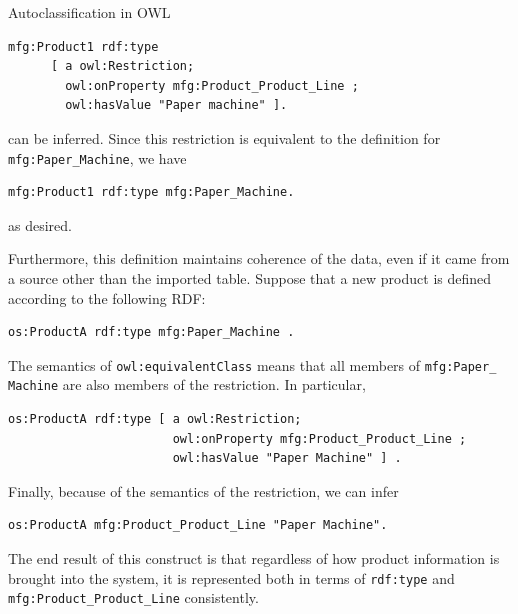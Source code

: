 \begin{challenge}{Autoclassification in OWL}
\begin{lstlisting}
mfg:Product1 rdf:type 
      [ a owl:Restriction; 
        owl:onProperty mfg:Product_Product_Line ;
        owl:hasValue "Paper machine" ].
\end{lstlisting}

can be inferred. Since this restriction is equivalent to the definition
for \texttt{mfg:Paper\_Machine}, we have

\begin{lstlisting}
mfg:Product1 rdf:type mfg:Paper_Machine.
\end{lstlisting}

as desired.

Furthermore, this definition maintains coherence of the data, even if it
came from a source other than the imported table. Suppose that a new
product is defined according to the following RDF:

\begin{lstlisting}
os:ProductA rdf:type mfg:Paper_Machine .
\end{lstlisting}

The semantics of \texttt{owl:equivalentClass} means that all members of
\texttt{mfg:Paper\_ Machine} are also members of the restriction. In particular,

\begin{lstlisting}
os:ProductA rdf:type [ a owl:Restriction;
                       owl:onProperty mfg:Product_Product_Line ;
                       owl:hasValue "Paper Machine" ] .
\end{lstlisting}

Finally, because of the semantics of the restriction, we can infer

\begin{lstlisting}
os:ProductA mfg:Product_Product_Line "Paper Machine".
\end{lstlisting}

The end result of this construct is that regardless of how product
information is brought into the system, it is represented both in terms
of \texttt{rdf:type} and \texttt{mfg:Product\_Product\_Line} consistently.
\end{challenge}

